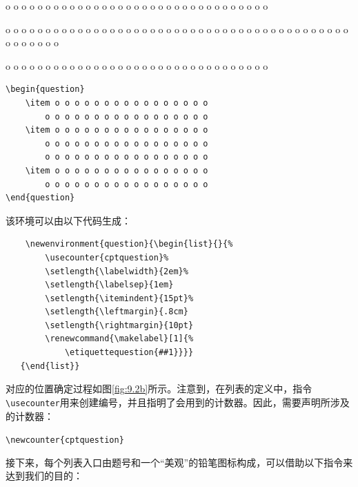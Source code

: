 \begin{codelist}[9.19]{
    \begin{question}
        \item o o o o o o o o o o o o o o o o
            o o o o o o o o o o o o o o o o o
        \item o o o o o o o o o o o o o o o o
            o o o o o o o o o o o o o o o o o
            o o o o o o o o o o o o o o o o o
        \item o o o o o o o o o o o o o o o o
            o o o o o o o o o o o o o o o o o
    \end{question}
}
\begin{verbatim}
\begin{question}
    \item o o o o o o o o o o o o o o o o
        o o o o o o o o o o o o o o o o o
    \item o o o o o o o o o o o o o o o o
        o o o o o o o o o o o o o o o o o
        o o o o o o o o o o o o o o o o o
    \item o o o o o o o o o o o o o o o o
        o o o o o o o o o o o o o o o o o
\end{question}\end{verbatim}
\end{codelist}

该环境可以由以下代码生成：

\begin{dmd}
\begin{verbatim}
    \newenvironment{question}{\begin{list}{}{% 
        \usecounter{cptquestion}% 
        \setlength{\labelwidth}{2em}% 
        \setlength{\labelsep}{1em} 
        \setlength{\itemindent}{15pt}% 
        \setlength{\leftmargin}{.8cm} 
        \setlength{\rightmargin}{10pt} 
        \renewcommand{\makelabel}[1]{%
            \etiquettequestion{##1}}}}
   {\end{list}}\end{verbatim}
\end{dmd}

对应的位置确定过程如图\ref{fig:9.2b}所示。注意到，在列表的定义中，指令\verb|\usecounter|用来创建编号，并且指明了会用到的计数器。因此，需要声明所涉及的计数器：

\begin{dmd}
\verb+\newcounter{cptquestion}+
\end{dmd}

接下来，每个列表入口由题号和一个“美观”的铅笔图标构成，可以借助以下指令来达到我们的目的：

